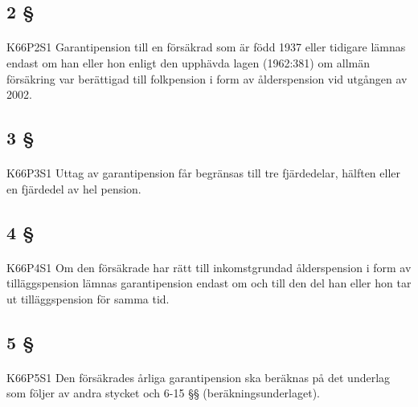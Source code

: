 \documentclass[a4paper,notitlepage,openany,10pt]{book}
\begin{document}
\subsection*{2 §}
\paragraph*{}
{\tiny K66P2S1}
Garantipension till en försäkrad som är född 1937 eller tidigare lämnas endast om han eller hon enligt den upphävda lagen (1962:381) om allmän försäkring var berättigad till folkpension i form av ålderspension vid utgången av 2002.
\subsection*{3 §}
\paragraph*{}
{\tiny K66P3S1}
Uttag av garantipension får begränsas till tre fjärdedelar, hälften eller en fjärdedel av hel pension.
\subsection*{4 §}
\paragraph*{}
{\tiny K66P4S1}
Om den försäkrade har rätt till inkomstgrundad ålderspension i form av tilläggspension lämnas garantipension endast om och till den del han eller hon tar ut tilläggspension för samma tid.
\subsection*{5 §}
\paragraph*{}
{\tiny K66P5S1}
Den försäkrades årliga garantipension ska beräknas på det underlag som följer av andra stycket och 6-15 §§ (beräkningsunderlaget).
\end{document}
